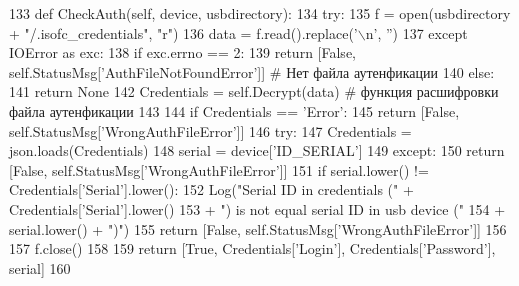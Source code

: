 \begin{DoxyCode}
133     \textcolor{keyword}{def }CheckAuth(self, device, usbdirectory):
134         \textcolor{keywordflow}{try}:
135             f = open(usbdirectory + \textcolor{stringliteral}{"/.isofc\_credentials"}, \textcolor{stringliteral}{"r")}
136 \textcolor{stringliteral}{            data = f.read().replace('\(\backslash\)n'}, \textcolor{stringliteral}{''})
137         \textcolor{keywordflow}{except} IOError \textcolor{keyword}{as} exc:
138             \textcolor{keywordflow}{if} exc.errno == 2:
139                 \textcolor{keywordflow}{return} [\textcolor{keyword}{False}, self.StatusMsg[\textcolor{stringliteral}{'AuthFileNotFoundError'}]] \textcolor{comment}{# Нет файла аутенфикации}
140             \textcolor{keywordflow}{else}:
141                 \textcolor{keywordflow}{return} \textcolor{keywordtype}{None}
142         Credentials = self.Decrypt(data) \textcolor{comment}{# функция расшифровки файла аутенфикации}
143 
144         \textcolor{keywordflow}{if} Credentials == \textcolor{stringliteral}{'Error'}:
145             \textcolor{keywordflow}{return} [\textcolor{keyword}{False}, self.StatusMsg[\textcolor{stringliteral}{'WrongAuthFileError'}]]
146         \textcolor{keywordflow}{try}:
147             Credentials = json.loads(Credentials)
148             serial = device[\textcolor{stringliteral}{'ID\_SERIAL'}]
149         \textcolor{keywordflow}{except}:
150             \textcolor{keywordflow}{return} [\textcolor{keyword}{False}, self.StatusMsg[\textcolor{stringliteral}{'WrongAuthFileError'}]]
151         \textcolor{keywordflow}{if} serial.lower() != Credentials[\textcolor{stringliteral}{'Serial'}].lower():
152             Log(\textcolor{stringliteral}{"Serial ID in credentials ("} + Credentials[\textcolor{stringliteral}{'Serial'}].lower()
153                 + \textcolor{stringliteral}{") is not equal serial ID in usb device ("}
154                 +  serial.lower() + \textcolor{stringliteral}{")"})
155             \textcolor{keywordflow}{return} [\textcolor{keyword}{False}, self.StatusMsg[\textcolor{stringliteral}{'WrongAuthFileError'}]]
156 
157         f.close()
158 
159         \textcolor{keywordflow}{return} [\textcolor{keyword}{True}, Credentials[\textcolor{stringliteral}{'Login'}], Credentials[\textcolor{stringliteral}{'Password'}], serial]
160 
\end{DoxyCode}
\mbox{\label{classisofc-service-2_1_1DeviceHandler_a0c5e62236097f3afa184be6bfbc61495}} 
